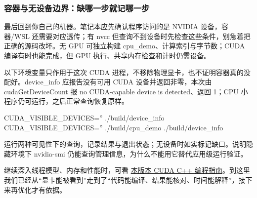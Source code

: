 \subsubsection{容器与无设备边界：缺哪一步就记哪一步}
最后回到你自己的机器。笔记本应先确认程序访问的是 NVIDIA 设备，容器/WSL 还需要对应透传；有 nvcc 但查询不到设备时先检查这些条件，别急着把正确的源码改坏。无 GPU 可独立构建 cpu\_demo、计算索引与字节数；CUDA 编译有时也能完成，但 GPU 执行、共享内存检查和计时仍需设备。
\begin{example}[模拟应用看不到设备]
以下环境变量只作用于这次 CUDA 进程，不移除物理显卡，也不证明容器真的没配好。device\_info 应报告没有可用 CUDA 设备并返回非零，本次由 cudaGetDeviceCount 报 no CUDA-capable device is detected、返回 1；CPU 小程序仍可运行，之后正常查询恢复原样。
\begin{tbash}
CUDA_VISIBLE_DEVICES='' ./build/device_info
CUDA_VISIBLE_DEVICES='' ./build/cpu_demo
./build/device_info
\end{tbash}
\end{example}
\begin{exercise}\label{ex:v2-cuda-boundary}
运行两种可见性下的查询，记录结果与退出状态；无设备时如实标记缺口。说明隐藏环境下 nvidia-smi 仍能查询管理信息，为什么不能用它替代应用级运行验证。
\end{exercise}
继续深入线程模型、内存和性能时，可看 \href{https://docs.nvidia.com/cuda/archive/12.6.3/cuda-c-programming-guide/index.html}{本版本 CUDA C++ 编程指南}。到这里我们已经从“显卡能被看到”走到了“代码能编译、结果能核对、时间能解释”，接下来再优化才有依据。

